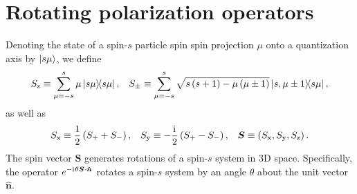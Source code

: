 \documentclass[notitlepage,twocolumn]{revtex4-2}
\newcommand{\f}[2]{\dfrac{#1}{#2}} %
\newcommand{\p}[1]{\left(#1\right)} %
\renewcommand{\v}{\bm} %
\newcommand{\uv}[1]{\bm{\hat{#1}}} %
\renewcommand{\i}{\mathrm{i}\mkern1mu} %
\newcommand{\x}{\text{x}}
\newcommand{\y}{\text{y}}
\newcommand{\z}{\text{z}}
\begin{document}




\onecolumngrid
\appendix

\section{Rotating polarization operators}
\label{sec:rotations}

Denoting the state of a spin-$s$ particle spin spin projection $\mu$ onto a quantization axis by $\ket{s\mu}$, we define
\begin{align}
  S_\z \equiv \sum_{\mu=-s}^s \mu \op{s\mu},
  &&
  S_\pm \equiv \sum_{\mu=-s}^s
  \sqrt{s\p{s+1}-\mu\p{\mu\pm1}} \op{s,\mu\pm1}{s\mu},
  \label{eq:spin_ops}
\end{align}
as well as
\begin{align}
  S_\x \equiv \f12\p{S_+ + S_-},
  &&
  S_\y \equiv -\f\i2\p{S_+-S_-},
  &&
  \v S \equiv \p{S_\x,S_\y,S_\z}.
\end{align}
The spin vector $\v S$ generates rotations of a spin-$s$ system in 3D space.
Specifically, the operator $e^{-\i\theta\v S\cdot\uv n}$ rotates a spin-$s$ system by an angle $\theta$ about the unit vector $\uv n$.
\end{document}
